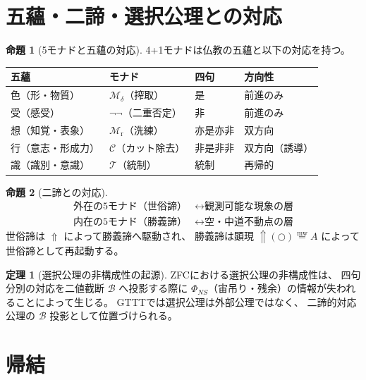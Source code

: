 \documentclass[11pt,a4paper]{ltjsarticle}
\newcommand{\mweq}{\mathrel{\overset{\mathrm{mw}}{=}}}
\newcommand{\metanegation}{\Uparrow}
\newcommand{\dfix}{\bigcirc}
\newcommand{\Bval}{\mathcal{B}}
\newcommand{\Md}{\mathcal{M}_\delta}
\newcommand{\Mnn}{\neg\neg}
\newcommand{\Mr}{\mathcal{M}_{\mathrm{r}}}
\newcommand{\MC}{\mathcal{C}}
\newcommand{\MT}{\mathcal{T}}
\theoremstyle{definition}
\newtheorem{theorem}{定理}[section]
\newtheorem{proposition}{命題}[section]
\begin{document}
\section{五蘊・二諦・選択公理との対応}

\begin{proposition}[5モナドと五蘊の対応]
4+1モナドは仏教の五蘊と以下の対応を持つ。
\begin{center}
\begin{tabular}{llll}
\hline
\textbf{五蘊} & \textbf{モナド} & \textbf{四句} & \textbf{方向性} \\
\hline
色（形・物質） & $\Md$（搾取） & 是 & 前進のみ \\
受（感受） & $\Mnn$（二重否定） & 非 & 前進のみ \\
想（知覚・表象） & $\Mr$（洗練） & 亦是亦非 & 双方向 \\
行（意志・形成力） & $\MC$（カット除去） & 非是非非 & 双方向（誘導） \\
識（識別・意識） & $\MT$（統制） & 統制 & 再帰的 \\
\hline
\end{tabular}
\end{center}
\end{proposition}

\begin{proposition}[二諦との対応]
\begin{align*}
\text{外在の5モナド（世俗諦）} &\longleftrightarrow \text{観測可能な現象の層} \\
\text{内在の5モナド（勝義諦）} &\longleftrightarrow \text{空・中道不動点の層}
\end{align*}
世俗諦は $\metanegation$ によって勝義諦へ駆動され、
勝義諦は顕現 $\metanegation(\dfix) \mweq A$ によって世俗諦として再起動する。
\end{proposition}

\begin{theorem}[選択公理の非構成性の起源]
ZFCにおける選択公理の非構成性は、
四句分別の対応を二値截断 $\Bval$ へ投影する際に
$\Phi_{NS}$（宙吊り・残余）の情報が失われることによって生じる。
GTTTでは選択公理は外部公理ではなく、
二諦的対応公理の $\Bval$ 投影として位置づけられる。
\end{theorem}

\section{帰結}
\end{document}

